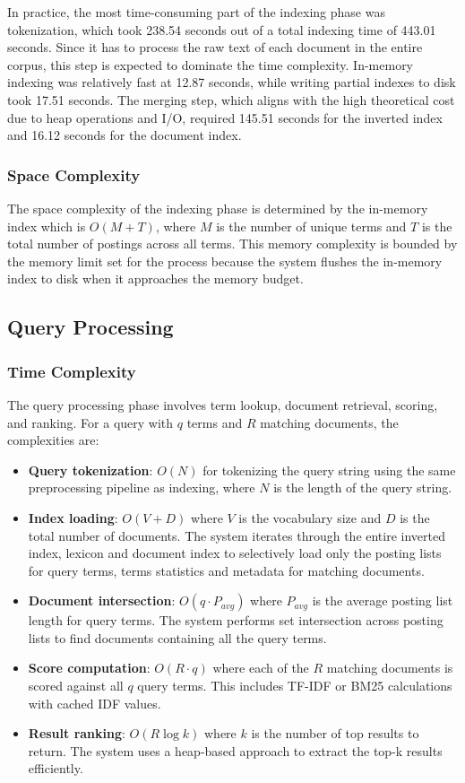 \documentclass[sigconf]{acmart}
\begin{document}
In practice, the most time-consuming part of the indexing phase was tokenization, which took 238.54 seconds out of a total indexing time of 443.01 seconds. Since it has to process the raw text of each document in the entire corpus, this step is expected to dominate the time complexity.
 In-memory indexing was relatively fast at 12.87 seconds, while writing partial indexes to disk took 17.51 seconds. The merging step, which aligns with the high theoretical cost due to heap operations and I/O, required 145.51 seconds for the inverted index and 16.12 seconds for the document index.

\subsubsection{Space Complexity}
The space complexity of the indexing phase is determined by the in-memory index which is $O(M + T)$, where $M$ is the number of unique terms and $T$ is the total number of postings across all terms. This 
memory complexity is bounded by the memory limit set for the process because the system flushes the in-memory index to disk when it approaches the memory budget.

\subsection{Query Processing}

\subsubsection{Time Complexity}
The query processing phase involves term lookup, document retrieval, scoring, and ranking. For a query with $q$ terms and $R$ matching documents, the complexities are:

\begin{itemize}
  \item \textbf{Query tokenization}: $O(N)$ for tokenizing the query string using the same preprocessing pipeline as indexing, where $N$ is the length of the query string.
  \item \textbf{Index loading}: $O(V + D)$ where $V$ is the vocabulary size and $D$ is the total number of documents. The system iterates through the entire inverted index, lexicon and document index to selectively load only the posting lists for query terms, terms statistics and metadata for matching documents.
  \item \textbf{Document intersection}: $O(q \cdot P_{avg})$ where $P_{avg}$ is the average posting list length for query terms. The system performs set intersection across posting lists to find documents containing all the query terms.
  \item \textbf{Score computation}: $O(R \cdot q)$ where each of the $R$ matching documents is scored against all $q$ query terms. This includes TF-IDF or BM25 calculations with cached IDF values.
  \item \textbf{Result ranking}: $O(R \log k)$ where $k$ is the number of top results to return. The system uses a heap-based approach to extract the top-k results efficiently.
\end{itemize}
\end{document}
